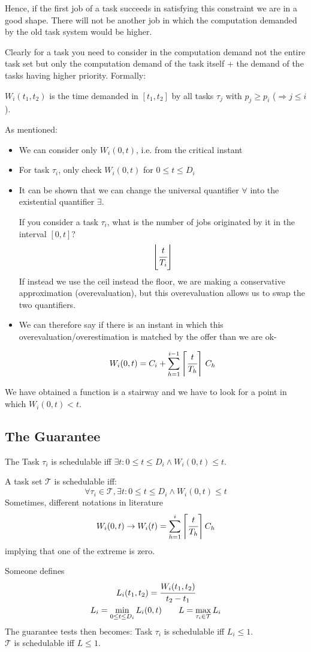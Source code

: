 Hence, if the first job of a task succeeds in satisfying this constraint we are in a good shape. There will not be another job in which the computation demanded by the old task system would be higher.

Clearly for a task you need to consider in the computation demand not the entire task set but only the computation demand of the task itself + the demand of the tasks having higher priority. Formally:

$W_i(t_1, t_2)$ is the time demanded in $[t_1, t_2]$ by all tasks $\tau_j$ with $p_j \ge p_i$ ($\Rightarrow j \le i$).

As mentioned:
\begin{itemize}
\item We can consider only $W_i(0, t)$, i.e. from the critical instant
\item For task $\tau_i$, only check $W_i(0,t )$ for $0\le t\le D_i$
\item It can be shown that we can change the universal quantifier $\forall$ into the existential quantifier $\exists$. 

If you consider a task $\tau_i$, what is the number of jobs originated by it in the interval $[0, t]$? 
\[\left\lfloor \cfrac{t}{T_i} \right\rfloor\]
If instead we use the ceil instead the floor, we are making a conservative approximation (overevaluation), but this overevaluation allows us to swap the two quantifiers.
\item We can therefore say if there is an instant in which this overevaluation/overestimation is matched by the offer than we are ok-

\[W_i(0,t) = C_i + \sum_{h=1}^{i-1}\left\lceil \cfrac{t}{T_h} \right\rceil\,C_h\]
\end{itemize}

We have obtained a function is a stairway and we have to look for a point in which $W_i(0,t) < t$.

\subsection{The Guarantee}
The Task $\tau_i$ is schedulable iff $\exists t: 0\le t\le D_i \wedge W_i(0,t) \le t$.

A task set $\mathcal{T}$ is schedulable iff:
\[\forall \tau_i \in \mathcal{T}, \exists t: 0 \le t \le D_i \wedge W_i(0, t) \le t\]
Sometimes, different notations in literature
\[W_i(0,t) \rightarrow W_i(t) =\sum_{h=1}^{i}\left\lceil \cfrac{t}{T_h} \right\rceil C_h\]
implying that one of the extreme is zero.

Someone defines
\begin{gather*}
L_i(t_1, t_2) = \cfrac{W_i(t_1, t_2)}{t_2 - t_1}\\
L_i = \min_{0\le t\le D_i} L_i(0,t) \qquad L = \max_{\tau_i\in\mathcal{T}} L_i
\end{gather*}
The guarantee tests then becomes: 
Task $\tau_i$ is schedulable iff $L_i \le 1$.\\
$\mathcal{T}$ is schedulable iff $L \le 1$.


